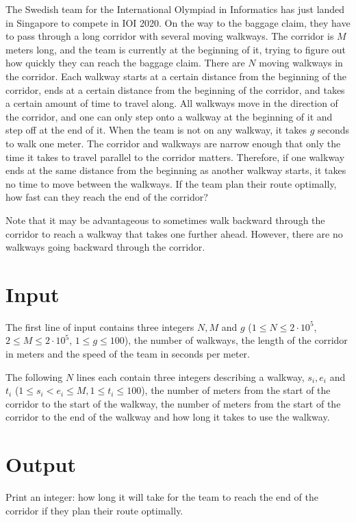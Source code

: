 \noindent
The Swedish team for the International Olympiad in Informatics has just landed in Singapore to compete in IOI 2020.
On the way to the baggage claim, they have to pass through a long corridor with several moving walkways.
The corridor is $M$ meters long, and the team is currently at the beginning of it, trying to figure out how quickly
they can reach the baggage claim. There are $N$ moving walkways in the corridor. Each walkway starts at a certain
distance from the beginning of the corridor, ends at a certain distance from the beginning of the corridor, and
takes a certain amount of time to travel along. All walkways move in the direction of the corridor, and one can
only step onto a walkway at the beginning of it and step off at the end of it. When the team is not on any walkway,
it takes $g$ seconds to walk one meter. The corridor and walkways are narrow enough that only the time it takes to
travel parallel to the corridor matters. Therefore, if one walkway ends at the same distance from the beginning as
another walkway starts, it takes no time to move between the walkways. If the team plan their route optimally, how
fast can they reach the end of the corridor?

Note that it may be advantageous to sometimes walk backward through the
corridor to reach a walkway that takes one further ahead. However, there are no walkways going backward through the corridor.

\section*{Input}
The first line of input contains three integers $N, M$ and $g$ ($1 \le N \le 2 \cdot 10^5$, $2 \le M \le 2 \cdot 10^5$, $1 \le g \le 100$),
the number of walkways, the length of the corridor in meters and the speed of the team in seconds per meter.

The following $N$ lines each contain three integers describing a walkway, $s_i, e_i$ and $t_i$ 
($1\leq s_i < e_i\leq M,1\leq t_i\leq100$), the number of meters from the start of the corridor to the start of the walkway,
the number of meters from the start of the corridor to the end of the walkway and how long it takes to use the walkway.

\section*{Output}
Print an integer: how long it will take for the team to reach the end of the corridor if they plan their route optimally.


